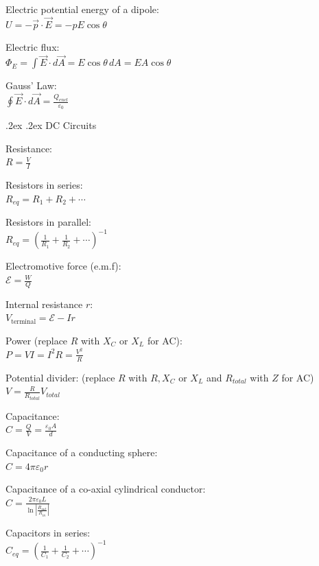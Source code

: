\documentclass[10pt,landscape,a4paper]{article}
\makeatletter
\renewcommand{\section}{\@startsection{section}{1}{0mm}%
  {.2ex}%
  {.2ex}%
  {\color{myblue}\sffamily\small\bfseries}}
\makeatother
\begin{document}
\begin{multicols*}{5}
  Electric potential energy of a dipole: \\
  \(U = - \vec{p} \cdot \vec{E} = - pE \cos \theta\)

  Electric flux: \\
  \(\Phi_E = \int \vec{E} \cdot d \vec{A} = E \cos \theta \, dA = EA \cos \theta\)

  Gauss' Law: \\
  \(\oint \vec{E} \cdot d \vec{A} = \frac{Q_{encl}}{\varepsilon_0}\)


  \section{DC Circuits}

  Resistance: \\
  \(R = \frac{V}{I}\)

  Resistors in series: \\
  \(R_{eq} = R_1 + R_2 + \cdots\)

  Resistors in parallel: \\
  \(R_{eq} = \left(\frac{1}{R_1} + \frac{1}{R_2} + \cdots \right)^{-1}\)

  Electromotive force (e.m.f): \\
  \(\mathcal{E} = \frac{W}{Q}\)

  Internal resistance \(r\): \\
  \(V_{\text{terminal}} = \mathcal{E} - Ir\)

  Power (replace \(R\) with \(X_C\) or \(X_L\) for AC): \\
  \(P = VI = I^2 R = \frac{V^2}{R}\)

  Potential divider: (replace \(R\) with \(R, X_C\) or \(X_L\) and \(R_{total}\) with \(Z\) for AC) \\
  \(V = \frac{R}{R_{total}} V_{total}\)

  Capacitance: \\
  \(C = \frac{Q}{V} = \frac{\varepsilon_0 A}{d}\)

  Capacitance of a conducting sphere: \\
  \(C = 4 \pi \varepsilon_0 r\)

  Capacitance of a co-axial cylindrical conductor: \\
  \(C = \frac{2 \pi \varepsilon_0 L}{\ln \left| \frac{R_{out}}{R_{in}} \right|}\)

  Capacitors in series: \\
  \(C_{eq} = \left(\frac{1}{C_1} + \frac{1}{C_2} + \cdots \right)^{-1}\)


\end{multicols*}
\end{document}

